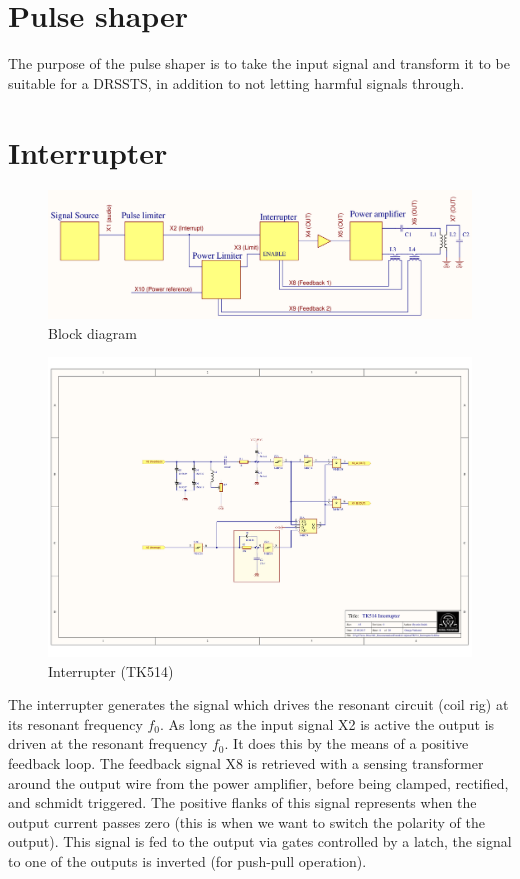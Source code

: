 \section{Pulse shaper}
The purpose of the pulse shaper is to take the input signal and transform it to be suitable for a DRSSTS, in addition to not letting harmful signals through.

\section{Interrupter}

\begin{figure}[h!]
    \centering
    \includegraphics[width=\textwidth]{Skjema/FunksjonsBlokkskjema.pdf}
    \caption{Block diagram}
    \label{fig:block}
\end{figure}

\begin{figure}[h!]
    \centering
    \includegraphics[trim={6.5cm 5cm 7cm 5.5cm},clip,width=\textwidth]{Skjema/TK514_Interrupter.pdf}
    \caption{Interrupter (TK514)}
    \label{fig:interrupter}
\end{figure}

The interrupter generates the signal which drives the resonant circuit (coil rig) at its resonant frequency $f_0$. As long as the input signal X2 is active the output is driven at the resonant frequency $f_0$. It does this by the means of a positive feedback loop. The feedback signal X8 is retrieved with a sensing transformer around the output wire from the power amplifier, before being clamped, rectified, and schmidt triggered. The positive flanks of this signal represents when the output current passes zero (this is when we want to switch the polarity of the output). This signal is fed to the output via gates controlled by a latch, the signal to one of the outputs is inverted (for push-pull operation).

